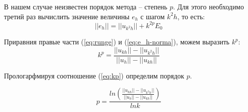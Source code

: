 В нашем случае неизвестен порядок метода -- степень $p$. Для этого необходимо третий раз вычислить значение величины $e_h$ с шагом $k^2h$, то есть:
\begin{equation}
     ||e_h|| = ||u_{k^2h}|| + k^{2p}E_0
    \label{eq:e_h-norma}
\end{equation}

Приравния правые части (\ref{eq:runge}) и (\ref{eq:e_h-norma}), можем выразить $k^p$:
\begin{equation}
    k^p = \frac{||u_{kh}|| - ||u_{k^2h}||}{||u_{h}|| - ||u_{kh}||}
    \label{eq:kp}
\end{equation} 
\soeq{}

Прологарфмируя соотношение (\ref{eq:kp}) определим порядок $p$.

\begin{equation}
    p =\frac{ ln \left(\frac{||u_{kh}|| - ||u_{k^2h}||}{||u_{h}|| - ||u_{kh}||}\right)}{ln k}
    \label{eq:mke-level}
\end{equation}
